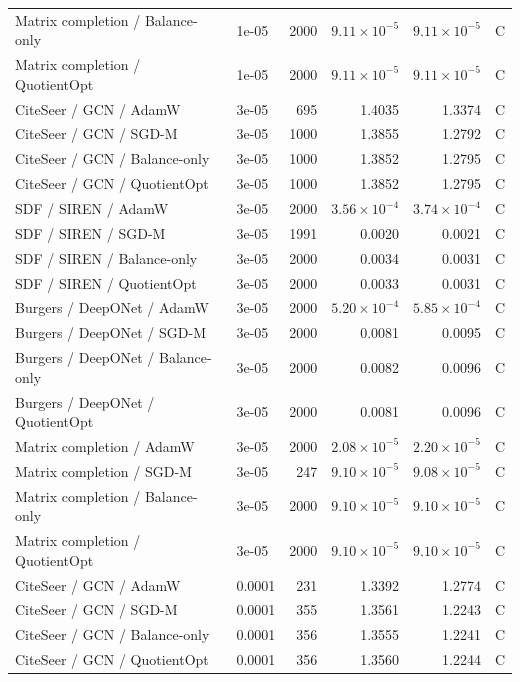 \begin{longtable}{p{.34\linewidth}p{.09\linewidth}rrrr}
Matrix completion / Balance-only & 1e-05 & 2000 & $9.11\!\times\!10^{-5}$ & $9.11\!\times\!10^{-5}$ & C\\
\rowcolor{oursbg}Matrix completion / QuotientOpt & 1e-05 & 2000 & $9.11\!\times\!10^{-5}$ & $9.11\!\times\!10^{-5}$ & C\\
CiteSeer / GCN / AdamW & 3e-05 & 695 & 1.4035 & 1.3374 & C\\
CiteSeer / GCN / SGD-M & 3e-05 & 1000 & 1.3855 & 1.2792 & C\\
CiteSeer / GCN / Balance-only & 3e-05 & 1000 & 1.3852 & 1.2795 & C\\
\rowcolor{oursbg}CiteSeer / GCN / QuotientOpt & 3e-05 & 1000 & 1.3852 & 1.2795 & C\\
SDF / SIREN / AdamW & 3e-05 & 2000 & $3.56\!\times\!10^{-4}$ & $3.74\!\times\!10^{-4}$ & C\\
SDF / SIREN / SGD-M & 3e-05 & 1991 & 0.0020 & 0.0021 & C\\
SDF / SIREN / Balance-only & 3e-05 & 2000 & 0.0034 & 0.0031 & C\\
\rowcolor{oursbg}SDF / SIREN / QuotientOpt & 3e-05 & 2000 & 0.0033 & 0.0031 & C\\
Burgers / DeepONet / AdamW & 3e-05 & 2000 & $5.20\!\times\!10^{-4}$ & $5.85\!\times\!10^{-4}$ & C\\
Burgers / DeepONet / SGD-M & 3e-05 & 2000 & 0.0081 & 0.0095 & C\\
Burgers / DeepONet / Balance-only & 3e-05 & 2000 & 0.0082 & 0.0096 & C\\
\rowcolor{oursbg}Burgers / DeepONet / QuotientOpt & 3e-05 & 2000 & 0.0081 & 0.0096 & C\\
Matrix completion / AdamW & 3e-05 & 2000 & $2.08\!\times\!10^{-5}$ & $2.20\!\times\!10^{-5}$ & C\\
Matrix completion / SGD-M & 3e-05 & 247 & $9.10\!\times\!10^{-5}$ & $9.08\!\times\!10^{-5}$ & C\\
Matrix completion / Balance-only & 3e-05 & 2000 & $9.10\!\times\!10^{-5}$ & $9.10\!\times\!10^{-5}$ & C\\
\rowcolor{oursbg}Matrix completion / QuotientOpt & 3e-05 & 2000 & $9.10\!\times\!10^{-5}$ & $9.10\!\times\!10^{-5}$ & C\\
CiteSeer / GCN / AdamW & 0.0001 & 231 & 1.3392 & 1.2774 & C\\
CiteSeer / GCN / SGD-M & 0.0001 & 355 & 1.3561 & 1.2243 & C\\
CiteSeer / GCN / Balance-only & 0.0001 & 356 & 1.3555 & 1.2241 & C\\
\rowcolor{oursbg}CiteSeer / GCN / QuotientOpt & 0.0001 & 356 & 1.3560 & 1.2244 & C\\

\end{longtable}
